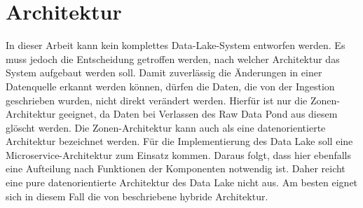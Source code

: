 \section{Architektur}
In dieser Arbeit kann kein komplettes Data-Lake-System entworfen werden.
Es muss jedoch die Entscheidung getroffen werden, nach welcher Architektur das System aufgebaut werden soll.
Damit zuverlässig die Änderungen in einer Datenquelle erkannt werden können, dürfen die Daten, die von der Ingestion geschrieben wurden, nicht direkt verändert werden.
Hierfür ist nur die Zonen-Architektur geeignet, da Daten bei Verlassen des Raw Data Pond aus diesem glöscht werden.
Die Zonen-Architektur kann auch als eine datenorientierte Architektur bezeichnet werden.
Für die Implementierung des Data Lake soll eine Microservice-Architektur zum Einsatz kommen.
Daraus folgt, dass hier ebenfalls eine Aufteilung nach Funktionen der Komponenten notwendig ist.
Daher reicht eine pure datenorientierte Architektur des Data Lake nicht aus.
Am besten eignet sich in diesem Fall die von \textcite{sawadogo2021data} beschriebene hybride Architektur.

